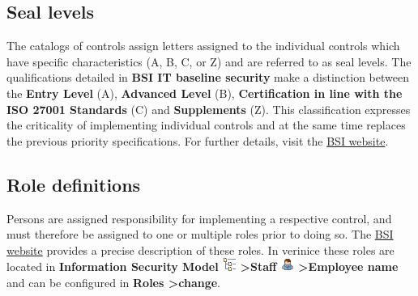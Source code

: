 \documentclass[a4paper,10pt]{book}
\begin{document}
\subsection{Seal levels}
The catalogs of controls assign letters assigned to the individual controls which have specific characteristics
(A, B, C, or Z) and are referred to as seal levels. The qualifications detailed in \textbf{BSI IT baseline security}
make a distinction between the \textbf{Entry Level} (A), \textbf{Advanced Level} (B),
\textbf{Certification in line with the ISO 27001 Standards} (C) and \textbf{Supplements} (Z). This classification expresses the criticality
of implementing individual controls and at the same time replaces the previous priority specifications.
For further details, visit the \href{https://www.bsi.bund.de/cln_156/DE/Themen/weitereThemen/ITGrundschutzSchulung/NeuesimITGrundschutz/LebenszyklusundSiegelstufen/lebenszyklusundsiegelstufen_node.html}{BSI website}.

\subsection{Role definitions}
Persons are assigned responsibility for implementing a respective control, and must therefore be assigned to one or multiple
roles prior to doing so. The \href{https://www.bsi.bund.de/cln_156/DE/Themen/weitereThemen/ITGrundschutzKataloge/Inhalt/Rollendefinitionen/rollendefinitionen_node.html}{BSI website}
provides a precise description of these roles. In verinice these roles are located in
\textbf{Information Security Model \includegraphics[height=2ex]{Icon/GS_Modell.png} \textgreater Staff \includegraphics[height=2ex]{Icon/Mitarbeiter.png} \textgreater Employee name}
and can be configured in \textbf{Roles \textgreater change}.
\end{document}
